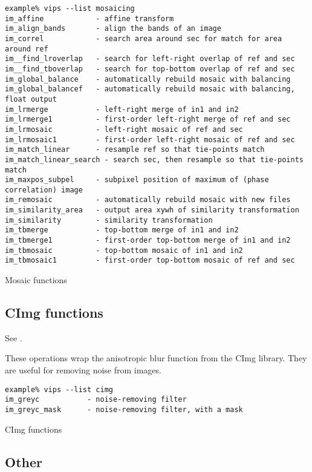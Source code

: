 \begin{fig2}
\begin{verbatim}
example% vips --list mosaicing
im_affine            - affine transform
im_align_bands       - align the bands of an image
im_correl            - search area around sec for match for area around ref
im__find_lroverlap   - search for left-right overlap of ref and sec
im__find_tboverlap   - search for top-bottom overlap of ref and sec
im_global_balance    - automatically rebuild mosaic with balancing
im_global_balancef   - automatically rebuild mosaic with balancing, float output
im_lrmerge           - left-right merge of in1 and in2
im_lrmerge1          - first-order left-right merge of ref and sec
im_lrmosaic          - left-right mosaic of ref and sec
im_lrmosaic1         - first-order left-right mosaic of ref and sec
im_match_linear      - resample ref so that tie-points match
im_match_linear_search - search sec, then resample so that tie-points match
im_maxpos_subpel     - subpixel position of maximum of (phase correlation) image
im_remosaic          - automatically rebuild mosaic with new files
im_similarity_area   - output area xywh of similarity transformation
im_similarity        - similarity transformation
im_tbmerge           - top-bottom merge of in1 and in2
im_tbmerge1          - first-order top-bottom merge of in1 and in2
im_tbmosaic          - top-bottom mosaic of in1 and in2
im_tbmosaic1         - first-order top-bottom mosaic of ref and sec
\end{verbatim}
\caption{Mosaic functions}
\label{fg:mosaicing}
\end{fig2}

\subsection{CImg functions}

See .

These operations wrap the anisotropic blur function from the CImg library.
They are useful for removing noise from images.

\begin{fig2}
\begin{verbatim}
example% vips --list cimg
im_greyc           - noise-removing filter
im_greyc_mask      - noise-removing filter, with a mask
\end{verbatim}
\caption{CImg functions}
\label{fg:cimg}
\end{fig2}

\subsection{Other}

